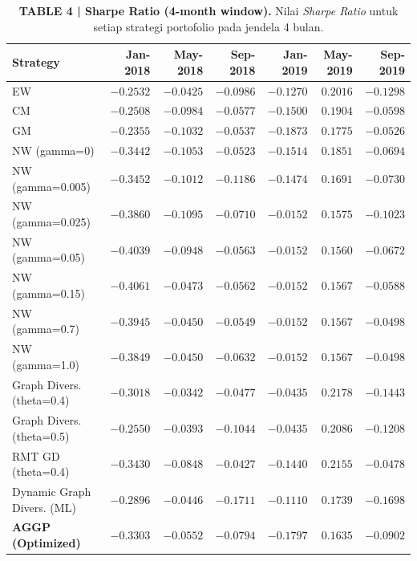 \documentclass[12pt,a4paper]{article}
\begin{document}
\begin{table}[h!]
    \centering
    \footnotesize
    \setlength{\tabcolsep}{4pt}
    \caption{\textbf{TABLE 4 | Sharpe Ratio (4-month window).} Nilai \textit{Sharpe Ratio} untuk setiap strategi portofolio pada jendela 4 bulan.}
    \begin{tabular}{lrrrrrr}
        \toprule
        \textbf{Strategy} & \textbf{Jan-2018} & \textbf{May-2018} & \textbf{Sep-2018} & \textbf{Jan-2019} & \textbf{May-2019} & \textbf{Sep-2019} \\
        \midrule
        EW                          & $-0.2532$ & $-0.0425$ & $-0.0986$ & $-0.1270$ & $0.2016$  & $-0.1298$ \\
        CM                          & $-0.2508$ & $-0.0984$ & $-0.0577$ & $-0.1500$ & $0.1904$  & $-0.0598$ \\
        GM                          & $-0.2355$ & $-0.1032$ & $-0.0537$ & $-0.1873$ & $0.1775$  & $-0.0526$ \\
        NW (gamma=0)                & $-0.3442$ & $-0.1053$ & $-0.0523$ & $-0.1514$ & $0.1851$  & $-0.0694$ \\
        NW (gamma=0.005)            & $-0.3452$ & $-0.1012$ & $-0.1186$ & $-0.1474$ & $0.1691$  & $-0.0730$ \\
        NW (gamma=0.025)            & $-0.3860$ & $-0.1095$ & $-0.0710$ & $-0.0152$ & $0.1575$  & $-0.1023$ \\
        NW (gamma=0.05)             & $-0.4039$ & $-0.0948$ & $-0.0563$ & $-0.0152$ & $0.1560$  & $-0.0672$ \\
        NW (gamma=0.15)             & $-0.4061$ & $-0.0473$ & $-0.0562$ & $-0.0152$ & $0.1567$  & $-0.0588$ \\
        NW (gamma=0.7)              & $-0.3945$ & $-0.0450$ & $-0.0549$ & $-0.0152$ & $0.1567$  & $-0.0498$ \\
        NW (gamma=1.0)              & $-0.3849$ & $-0.0450$ & $-0.0632$ & $-0.0152$ & $0.1567$  & $-0.0498$ \\
        Graph Divers. (theta=0.4)   & $-0.3018$ & $-0.0342$ & $-0.0477$ & $-0.0435$ & $0.2178$  & $-0.1443$ \\
        Graph Divers. (theta=0.5)   & $-0.2550$ & $-0.0393$ & $-0.1044$ & $-0.0435$ & $0.2086$  & $-0.1208$ \\
        RMT GD (theta=0.4)          & $-0.3430$ & $-0.0848$ & $-0.0427$ & $-0.1440$ & $0.2155$  & $-0.0478$ \\
        Dynamic Graph Divers. (ML)  & $-0.2896$ & $-0.0446$ & $-0.1711$ & $-0.1110$ & $0.1739$  & $-0.1698$ \\
        \textbf{AGGP (Optimized)}   & $\mathbf{-0.3303}$ & $\mathbf{-0.0552}$ & $\mathbf{-0.0794}$ & $\mathbf{-0.1797}$ & $\mathbf{0.1635}$ & $\mathbf{-0.0902}$ \\
        \bottomrule
    \end{tabular}
\end{table}
\end{document}
